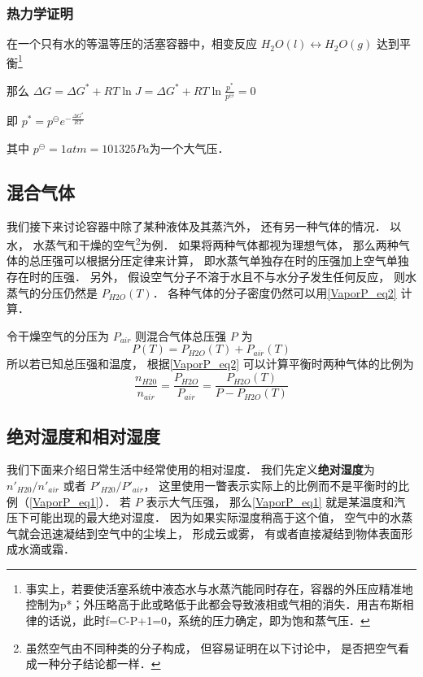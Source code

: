 \subsubsection{热力学证明}
在一个只有水的等温等压的活塞容器中，相变反应 $H_2O(l) \leftrightarrow H_2O(g)$ 达到平衡\footnote{事实上，若要使活塞系统中液态水与水蒸汽能同时存在，容器的外压应精准地控制为p*；外压略高于此或略低于此都会导致液相或气相的消失．用吉布斯相律的话说，此时f=C-P+1=0，系统的压力确定，即为饱和蒸气压．}

那么 $\Delta G = \Delta G^* + RT \ln J = \Delta G^* + RT \ln \frac{p^*}{p^\ominus} =0$

即 $p^* = p^\ominus e^{-\frac{\Delta G^*}{RT}}$

其中 $p^\ominus = 1 atm = 101325 Pa$为一个大气压．

\subsection{混合气体}

我们接下来讨论容器中除了某种液体及其蒸汽外， 还有另一种气体的情况． 以水， 水蒸气和干燥的空气\footnote{虽然空气由不同种类的分子构成， 但容易证明在以下讨论中， 是否把空气看成一种分子结论都一样．}为例． 如果将两种气体都视为理想气体， 那么两种气体的总压强可以根据分压定律来计算， 即水蒸气单独存在时的压强加上空气单独存在时的压强． 另外， 假设空气分子不溶于水且不与水分子发生任何反应， 则水蒸气的分压仍然是 $P_{H2O}(T)$． 各种气体的分子密度仍然可以用\autoref{VaporP_eq2} 计算．

令干燥空气的分压为 $P_{air}$ 则混合气体总压强 $P$ 为
\begin{equation}
P(T) = P_{H2O}(T) + P_{air}(T)
\end{equation}
所以若已知总压强和温度， 根据\autoref{VaporP_eq2} 可以计算平衡时两种气体的比例为
\begin{equation}\label{VaporP_eq1}
\frac{n_{H20}}{n_{air}} = \frac{P_{H2O}}{P_{air}} = \frac{P_{H2O}(T)}{P - P_{H2O}(T)}
\end{equation}

\subsection{绝对湿度和相对湿度}
我们下面来介绍日常生活中经常使用的相对湿度． 我们先定义\textbf{绝对湿度}为 $n'_{H20}/n'_{air}$ 或者 $P'_{H20}/P'_{air}$， 这里使用一瞥表示实际上的比例而不是平衡时的比例（\autoref{VaporP_eq1}）． 若 $P$ 表示大气压强， 那么\autoref{VaporP_eq1} 就是某温度和汽压下可能出现的最大绝对湿度． 因为如果实际湿度稍高于这个值， 空气中的水蒸气就会迅速凝结到空气中的尘埃上， 形成云或雾， 有或者直接凝结到物体表面形成水滴或霜．

